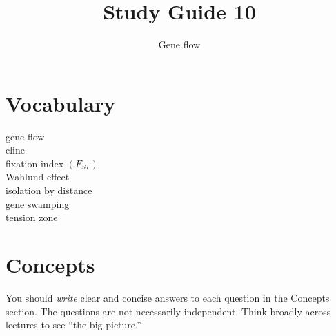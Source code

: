 \documentclass[letterpaper]{tufte-handout}
\title{Study Guide 10\hfill}
\author{Gene flow}
\date{} %
\begin{document}
\maketitle	%

\section{Vocabulary}

\begin{multicols}{2}
gene flow \\
cline \\
fixation index $(F_{ST})$ \\
Wahlund effect \\
isolation by distance \\
gene swamping \\
tension zone
\end{multicols}


\section{Concepts}

You should \emph{write} clear and concise answers to each question in the Concepts section.  The questions are not necessarily independent.  Think broadly across lectures to see ``the big picture.'' 
\end{document}
